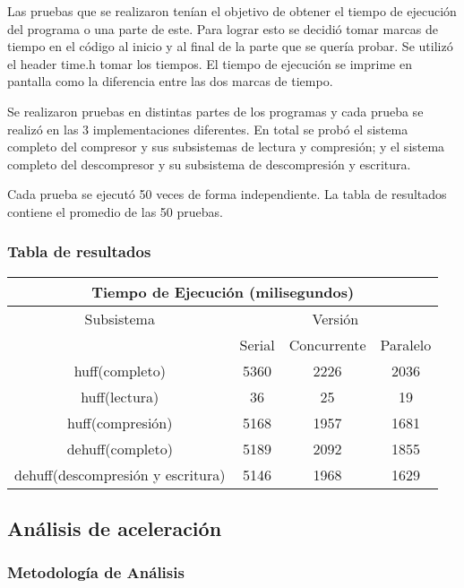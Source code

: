 \documentclass{report}
\begin{document}
Las pruebas que se realizaron tenían el objetivo de obtener el tiempo de ejecución del programa o una parte de este. Para lograr esto se decidió tomar marcas de tiempo en el código al inicio y al final de la parte que se quería probar. Se utilizó el header time.h tomar los tiempos. El tiempo de ejecución  se imprime en pantalla como la diferencia entre las dos marcas de tiempo.

Se realizaron pruebas en distintas partes de los programas y cada prueba se realizó en las 3 implementaciones diferentes. En total se probó el sistema completo del compresor y sus subsistemas de lectura y compresión; y el sistema completo del descompresor y su subsistema de descompresión y escritura.

Cada prueba se ejecutó 50 veces de forma independiente. La tabla de resultados contiene el promedio de las 50 pruebas.

\subsubsection{Tabla de resultados}

\begin{center}
	\begin{tabular}{|c|c|c|c|}		
		
\hline
\multicolumn{4}{|c|}{Tiempo de Ejecución (milisegundos)} \\
\hline
 Subsistema& \multicolumn{3}{|c|}{Versión} \\
 \hline
 & Serial & Concurrente & Paralelo\\
 \hline
huff(completo) & 5360& 2226 & 2036\\
 \hline
huff(lectura) &  36 & 25 & 19\\
 \hline
 huff(compresión) &  5168 & 1957 & 1681\\
 \hline
 dehuff(completo) & 5189 & 2092 & 1855\\
 \hline
 dehuff(descompresión y escritura) & 5146 & 1968 & 1629\\
 \hline
 
	\end{tabular}
\end{center}

\subsection{Análisis de aceleración}

\subsubsection{Metodología de Análisis}
\end{document}

